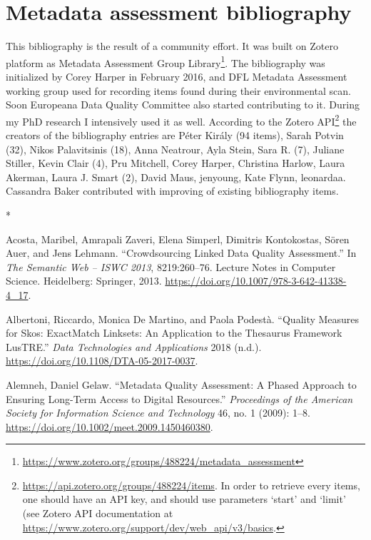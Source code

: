 \chapter{Metadata assessment bibliography}


This bibliography is the result of a community effort. It was built on Zotero platform as Metadata Assessment Group Library\footnote{\url{https://www.zotero.org/groups/488224/metadata_assessment}}. The bibliography was initialized by Corey Harper in February 2016, and DFL Metadata Assessment working group used for recording items found during their environmental scan. Soon Europeana Data Quality Committee also started contributing to it. During my PhD research I intensively used it as well. According to the Zotero API\footnote{\url{https://api.zotero.org/groups/488224/items}. In order to retrieve every items, one should have an API key, and should use parameters `start' and `limit' (see Zotero API documentation at \url{https://www.zotero.org/support/dev/web_api/v3/basics}.} the creators of the bibliography entries are Péter Király (94 items), Sarah Potvin (32), Nikos Palavitsinis (18), Anna Neatrour, Ayla Stein, Sara R. (7), Juliane Stiller, Kevin Clair (4), Pru Mitchell, Corey Harper, Christina Harlow, Laura Akerman, Laura J. Smart (2), David Maus, jenyoung, Kate Flynn, leonardaa. Cassandra Baker contributed with improving of existing bibliography items.

\begin{center}
    *
\end{center}

Acosta, Maribel, Amrapali Zaveri, Elena Simperl, Dimitris Kontokostas, Sören Auer, and Jens Lehmann. “Crowdsourcing Linked Data Quality Assessment.” In \emph{The Semantic Web – ISWC 2013}, 8219:260–76. Lecture Notes in Computer Science. Heidelberg: Springer, 2013. \url{https://doi.org/10.1007/978-3-642-41338-4_17}.

Albertoni, Riccardo, Monica De Martino, and Paola Podestà. “Quality Measures for Skos: ExactMatch Linksets: An Application to the Thesaurus Framework LusTRE.” \emph{Data Technologies and Applications} 2018 (n.d.). \url{https://doi.org/10.1108/DTA-05-2017-0037}.

Alemneh, Daniel Gelaw. “Metadata Quality Assessment: A Phased Approach to Ensuring Long-Term Access to Digital Resources.” \emph{Proceedings of the American Society for Information Science and Technology} 46, no. 1 (2009): 1–8. \url{https://doi.org/10.1002/meet.2009.1450460380}.

